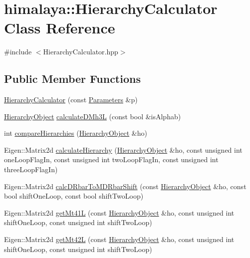 \hypertarget{classhimalaya_1_1HierarchyCalculator}{}\section{himalaya\+:\+:Hierarchy\+Calculator Class Reference}
\label{classhimalaya_1_1HierarchyCalculator}


{\ttfamily \#include $<$Hierarchy\+Calculator.\+hpp$>$}

\subsection*{Public Member Functions}
\begin{DoxyCompactItemize}
\item 
\hyperlink{classhimalaya_1_1HierarchyCalculator_a8d1d3911a84f05c234e0f66bd80d77e4}{Hierarchy\+Calculator} (const \hyperlink{structhimalaya_1_1Parameters}{Parameters} \&p)
\item 
\hyperlink{classhimalaya_1_1HierarchyObject}{Hierarchy\+Object} \hyperlink{classhimalaya_1_1HierarchyCalculator_a801db0c9292cac209043c71fa0351256}{calculate\+D\+Mh3L} (const bool \&is\+Alphab)
\item 
int \hyperlink{classhimalaya_1_1HierarchyCalculator_a6ae7d2bf7742c1a961a79bab4c860378}{compare\+Hierarchies} (\hyperlink{classhimalaya_1_1HierarchyObject}{Hierarchy\+Object} \&ho)
\item 
Eigen\+::\+Matrix2d \hyperlink{classhimalaya_1_1HierarchyCalculator_aa9a5d68155fa1b5d7376d9bf08470946}{calculate\+Hierarchy} (\hyperlink{classhimalaya_1_1HierarchyObject}{Hierarchy\+Object} \&ho, const unsigned int one\+Loop\+Flag\+In, const unsigned int two\+Loop\+Flag\+In, const unsigned int three\+Loop\+Flag\+In)
\item 
Eigen\+::\+Matrix2d \hyperlink{classhimalaya_1_1HierarchyCalculator_ab0e05fd01311e162d50acc741dcc9f8b}{calc\+D\+Rbar\+To\+M\+D\+Rbar\+Shift} (const \hyperlink{classhimalaya_1_1HierarchyObject}{Hierarchy\+Object} \&ho, const bool shift\+One\+Loop, const bool shift\+Two\+Loop)
\item 
Eigen\+::\+Matrix2d \hyperlink{classhimalaya_1_1HierarchyCalculator_a2366610066b408bbad9aeba98ada07fb}{get\+Mt41L} (const \hyperlink{classhimalaya_1_1HierarchyObject}{Hierarchy\+Object} \&ho, const unsigned int shift\+One\+Loop, const unsigned int shift\+Two\+Loop)
\item 
Eigen\+::\+Matrix2d \hyperlink{classhimalaya_1_1HierarchyCalculator_aa35b62a12a4f97b77830abf292858b05}{get\+Mt42L} (const \hyperlink{classhimalaya_1_1HierarchyObject}{Hierarchy\+Object} \&ho, const unsigned int shift\+One\+Loop, const unsigned int shift\+Two\+Loop)

\end{DoxyCompactItemize}
